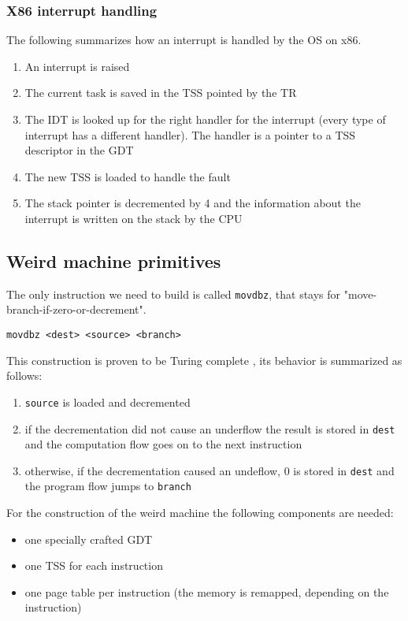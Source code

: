 \documentclass[11pt,twoside,a4paper]{article}
\begin{document}
\subsubsection{X86 interrupt handling}

The following summarizes how an interrupt is handled by the OS on x86.

\begin{enumerate}
\item An interrupt is raised
\item The current task is saved in the TSS pointed by the TR
\item The IDT is looked up for the right handler for the interrupt (every type of interrupt has a different handler). The handler is a pointer to a TSS descriptor in the GDT
\item The new TSS is loaded to handle the fault
\item The stack pointer is decremented by 4 and the information about the interrupt is written on the stack by the CPU
\end{enumerate}

\subsection{Weird machine primitives}

The only instruction we need to build is called \texttt{movdbz}, that stays for "move-branch-if-zero-or-decrement".

\texttt{movdbz <dest> <source> <branch>}

This construction is proven to be Turing complete \cite{mmu_machine}, its behavior is summarized as follows:
\begin{enumerate}
\item \texttt{source} is loaded and decremented
\item if the decrementation did not cause an underflow the result is stored in \texttt{dest} and the computation flow goes on to the next instruction
\item otherwise, if the decrementation caused an undeflow, 0 is stored in \texttt{dest} and the program flow jumps to \texttt{branch}
\end{enumerate}

For the construction of the weird machine the following components are needed:
\begin{itemize}
\item one specially crafted GDT
\item one TSS for each instruction
\item one page table per instruction (the memory is remapped, depending on the instruction)
\end{itemize}
\end{document}
